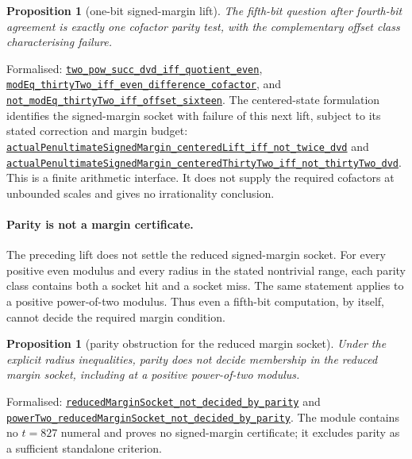 \documentclass[11pt]{article}
\newcommand{\commit}{81150c1c6fdd4cd51e76d3aa0de344341e0e9e7c}
\newcommand{\repobase}{https://github.com/wcook04/plectis-lean-erdos249-257/blob/\commit}
\newcommand{\PK}{Erdos249257}
\newcommand{\lref}[3]{\href{\repobase/\PK/#1\#L#2}{\nolinkurl{#3}}}
\newcommand{\lrefx}[3]{\href{\repobase/\PK/#1\#L#2}{\nolinkurl{#3}}}
\newtheorem{proposition}[theorem]{Proposition}
\theoremstyle{definition}
\theoremstyle{remark}
\begin{document}
\begin{proposition}[one-bit signed-margin lift]\label{res:powertwobitlift}
The fifth-bit question after fourth-bit agreement is exactly one cofactor
parity test, with the complementary offset class characterising failure.
\end{proposition}
\noindent Formalised:
\lref{PowerTwoBitLift.lean}{34}{two_pow_succ_dvd_iff_quotient_even},
\lref{PowerTwoBitLift.lean}{111}{modEq_thirtyTwo_iff_even_difference_cofactor},
and
\lref{PowerTwoBitLift.lean}{129}{not_modEq_thirtyTwo_iff_offset_sixteen}.
The centered-state formulation identifies the signed-margin socket with
failure of this next lift, subject to its stated correction and margin
budget:
\lrefx{PowerTwoCenteredBitLift.lean}{121}{actualPenultimateSignedMargin_centeredLift_iff_not_twice_dvd}
and
\lrefx{PowerTwoCenteredBitLift.lean}{159}{actualPenultimateSignedMargin_centeredThirtyTwo_iff_not_thirtyTwo_dvd}.
This is a finite arithmetic interface.  It does not supply the required
cofactors at unbounded scales and gives no irrationality conclusion.

\paragraph{Parity is not a margin certificate.}  The preceding lift does not
settle the reduced signed-margin socket.  For every positive even modulus and
every radius in the stated nontrivial range, each parity class contains both a
socket hit and a socket miss.  The same statement applies to a positive
power-of-two modulus.  Thus even a fifth-bit computation, by itself, cannot
decide the required margin condition.

\begin{proposition}[parity obstruction for the reduced margin socket]
\label{res:paritysocket}
Under the explicit radius inequalities, parity does not decide membership in
the reduced margin socket, including at a positive power-of-two modulus.
\end{proposition}
\noindent Formalised:
\lref{Totient827ParitySocketCeiling.lean}{73}{reducedMarginSocket_not_decided_by_parity}
and
\lref{Totient827ParitySocketCeiling.lean}{110}{powerTwo_reducedMarginSocket_not_decided_by_parity}.
The module contains no $t=827$ numeral and proves no signed-margin
certificate; it excludes parity as a sufficient standalone criterion.
\end{document}

